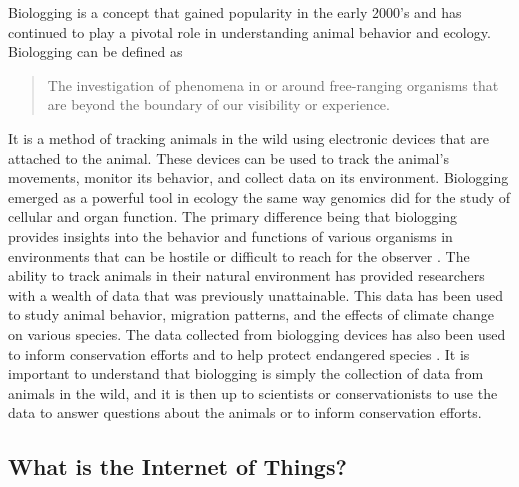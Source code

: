 \documentclass[sigplan,screen,nonacm]{acmart}
\begin{document}
Biologging is a concept that gained popularity in the early 2000's and has continued 
to play a pivotal role in understanding animal behavior and ecology. Biologging can be 
defined as 
\begin{quote}
  The investigation of phenomena in or around free-ranging organisms that are beyond 
  the boundary of our visibility or experience. \cite{boyd2004bio}
\end{quote}
It is a method of tracking animals in the wild using electronic devices that are 
attached to the animal. These devices can be used to track the animal's 
movements, monitor its behavior, and collect data on its environment. Biologging 
emerged as a powerful tool in ecology the same way genomics did for the study 
of cellular and organ function. The primary difference being that biologging provides 
insights into the behavior and functions of various organisms in environments that 
can be hostile or difficult to reach for the observer \cite{boyd2004bio}. The 
ability to track animals in their natural environment has provided researchers 
with a wealth of data that was previously unattainable. This data has been used 
to study animal behavior, migration patterns, and the effects of climate change 
on various species\cite{10.3389/fevo.2018.00092}. The data collected from biologging devices has also been 
used to inform conservation efforts and to help protect endangered species \cite{cooke2008biotelemetry}. 
It is important to understand that biologging is simply the collection of data
from animals in the wild, and it is then up to scientists or conservationists to use 
the data to answer questions about the animals or to inform conservation efforts. 

\subsection{What is the Internet of Things?}
\label{subsec:What is the Internet of Things}
\end{document}
